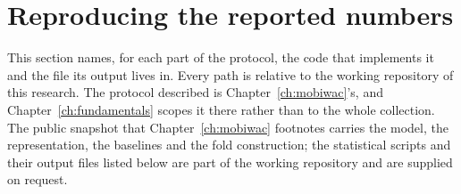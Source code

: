 \section{Reproducing the reported numbers}
\label{apx:contributions:repro}

This section names, for each part of the protocol, the code that implements it and the
file its output lives in. Every path is relative to the working repository of this
research. The protocol described is
Chapter~\ref{ch:mobiwac}'s, and Chapter~\ref{ch:fundamentals} scopes it there rather than
to the whole collection. The public snapshot that Chapter~\ref{ch:mobiwac} footnotes
carries the model, the representation, the baselines and the fold construction; the
statistical scripts and their output files listed below are part of the working repository
and are supplied on request.
